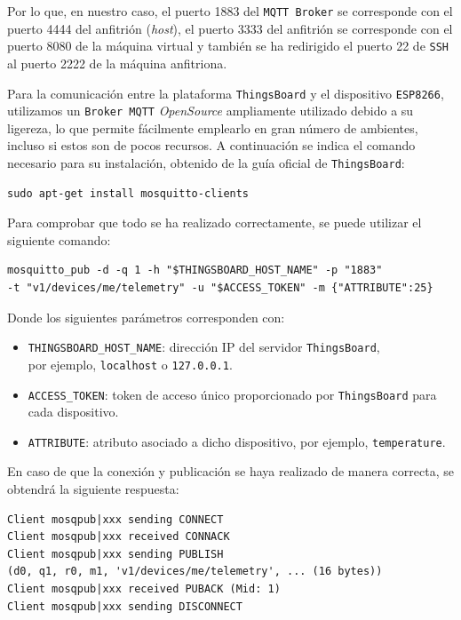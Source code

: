 Por lo que, en nuestro caso, el puerto 1883 del \texttt{MQTT Broker} se corresponde con el puerto 4444 del anfitrión (\textit{host}), el puerto 3333 del anfitrión se corresponde con el puerto 8080 de la máquina virtual y también se ha redirigido el puerto 22 de \texttt{SSH} al puerto 2222 de la máquina anfitriona.

Para la comunicación entre la plataforma \texttt{ThingsBoard} y el dispositivo \texttt{ESP8266}, utilizamos un \texttt{Broker MQTT} \textit{OpenSource} ampliamente utilizado debido a su ligereza, lo que permite fácilmente emplearlo en gran número de ambientes, incluso si estos son de pocos recursos. A continuación se indica el comando necesario para su instalación, obtenido de la guía oficial de \texttt{ThingsBoard}: \cite{thingsboardMQTTDeviceAPI}

\begin{verbatim}
sudo apt-get install mosquitto-clients
\end{verbatim}

Para comprobar que todo se ha realizado correctamente, se puede utilizar el siguiente comando:
\begin{verbatim}
mosquitto_pub -d -q 1 -h "$THINGSBOARD_HOST_NAME" -p "1883"
-t "v1/devices/me/telemetry" -u "$ACCESS_TOKEN" -m {"ATTRIBUTE":25}
\end{verbatim}

Donde los siguientes parámetros corresponden con:
\begin{itemize}
    \item \texttt{THINGSBOARD\_HOST\_NAME}: dirección IP del servidor \texttt{ThingsBoard}, \\
    por ejemplo, \texttt{localhost} o \texttt{127.0.0.1}.
    \item \texttt{ACCESS\_TOKEN}: token de acceso único proporcionado por \texttt{ThingsBoard} para cada dispositivo.
    \item \texttt{ATTRIBUTE}: atributo asociado a dicho dispositivo, por ejemplo, \texttt{temperature}.
\end{itemize}

En caso de que la conexión y publicación se haya realizado de manera correcta, se obtendrá la siguiente respuesta:
\begin{verbatim}
Client mosqpub|xxx sending CONNECT
Client mosqpub|xxx received CONNACK
Client mosqpub|xxx sending PUBLISH
(d0, q1, r0, m1, 'v1/devices/me/telemetry', ... (16 bytes))
Client mosqpub|xxx received PUBACK (Mid: 1)
Client mosqpub|xxx sending DISCONNECT
\end{verbatim}

